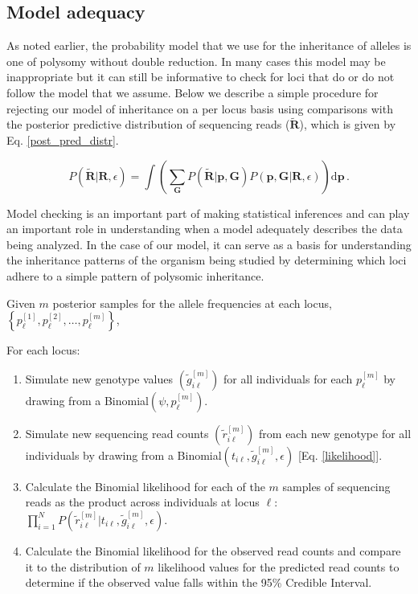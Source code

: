 \documentclass[11pt,english,letterpaper,oneside]{article}
\begin{document}
\medskip
\subsection*{Model adequacy}
\medskip

As noted earlier, the probability model that we use for the inheritance of alleles is one of polysomy without double reduction. In many cases this model may be inappropriate but it can still be informative to check for loci that do or do not follow the model that we assume. Below we describe a simple procedure for rejecting our model of inheritance on a per locus basis using comparisons with the posterior predictive distribution of sequencing reads ($\tilde{\bm{R}}$), which is given by Eq. \ref{post_pred_distr}.

\begin{equation}\label{post_pred_distr}
P(\tilde{\bm{R}}|\bm{R},\epsilon) = \int \left(\displaystyle\sum_{\bm{G}} P(\tilde{\bm{R}}|\bm{p},\bm{G}) P(\bm{p},\bm{G}|\bm{R},\epsilon)\right) \text{d}\bm{p}\, .
\end{equation}

\noindent Model checking is an important part of making statistical inferences and can play an important role in understanding when a model adequately describes the data being analyzed. In the case of our model, it can serve as a basis for understanding the inheritance patterns of the organism being studied by determining which loci adhere to a simple pattern of polysomic inheritance.
\medskip

Given $m$ posterior samples for the allele frequencies at each locus, $\left\{p_{\ell}^{[1]},p_{\ell}^{[2]},\ldots,p_{\ell}^{[m]} \right\}$, 
\medskip

\noindent For each locus:

\begin{enumerate}
  \item Simulate new genotype values $\left( \tilde{g}_{i \ell}^{[m]}\right)$ for all individuals for each $p_{\ell}^{[m]}$ by drawing from a Binomial$\left( \psi,p_{\ell}^{[m]} \right)$.
  \item Simulate new sequencing read counts $\left( \tilde{r}_{i \ell}^{[m]} \right)$ from each new genotype for all individuals by drawing from a Binomial$\left(t_{i \ell},\tilde{g}_{i \ell}^{[m]},\epsilon\right)$ [Eq. \ref{likelihood}].
  \item Calculate the Binomial likelihood for each of the $m$ samples of sequencing reads as the product across individuals at locus $\ell$: $\prod_{i=1}^{N}P\left(\tilde{r}_{i \ell}^{[m]} | t_{i \ell},\tilde{g}_{i \ell}^{[m]},\epsilon\right)$.
  \item Calculate the Binomial likelihood for the observed read counts and compare it to the distribution of $m$ likelihood values for the predicted read counts to determine if the observed value falls within the 95\% Credible Interval.
\end{enumerate}
\end{document}
